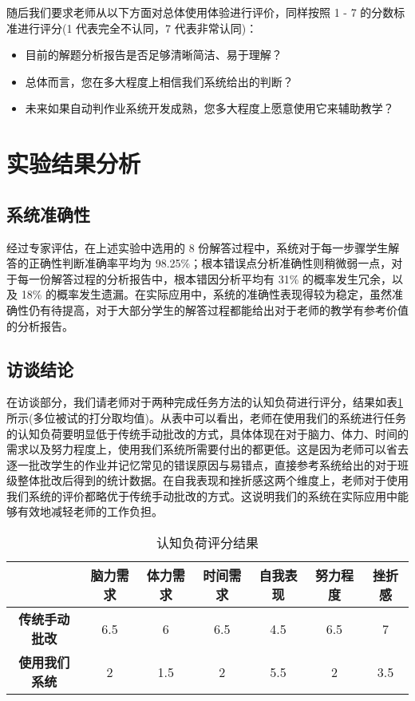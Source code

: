 随后我们要求老师从以下方面对总体使用体验进行评价，同样按照 1 - 7 的分数标准进行评分(1 代表完全不认同，7 代表非常认同)：

\begin{itemize}
    \item 目前的解题分析报告是否足够清晰简洁、易于理解？
    \item 总体而言，您在多大程度上相信我们系统给出的判断？
    \item 未来如果自动判作业系统开发成熟，您多大程度上愿意使用它来辅助教学？
\end{itemize}

\section{实验结果分析}

\subsection{系统准确性}

经过专家评估，在上述实验中选用的 8 份解答过程中，系统对于每一步骤学生解答的正确性判断准确率平均为 98.25\%；根本错误点分析准确性则稍微弱一点，对于每一份解答过程的分析报告中，根本错因分析平均有 31\% 的概率发生冗余，以及 18\% 的概率发生遗漏。在实际应用中，系统的准确性表现得较为稳定，虽然准确性仍有待提高，对于大部分学生的解答过程都能给出对于老师的教学有参考价值的分析报告。

\subsection{访谈结论}

在访谈部分，我们请老师对于两种完成任务方法的认知负荷进行评分，结果如表\ref{tab:nasa-tlx}所示(多位被试的打分取均值)。从表中可以看出，老师在使用我们的系统进行任务的认知负荷要明显低于传统手动批改的方式，具体体现在对于脑力、体力、时间的需求以及努力程度上，使用我们系统所需要付出的都更低。这是因为老师可以省去逐一批改学生的作业并记忆常见的错误原因与易错点，直接参考系统给出的对于班级整体批改后得到的统计数据。在自我表现和挫折感这两个维度上，老师对于使用我们系统的评价都略优于传统手动批改的方式。这说明我们的系统在实际应用中能够有效地减轻老师的工作负担。

\begin{table}
    \centering
    \caption{认知负荷评分结果}
    \label{tab:nasa-tlx}
    \begin{tabular}{c|cccccc}
        \toprule
        & \textbf{脑力需求} & \textbf{体力需求} & \textbf{时间需求} & \textbf{自我表现} & \textbf{努力程度} & \textbf{挫折感} \\
        \midrule
        \textbf{传统手动批改} & 6.5 & 6 & 6.5 & 4.5 & 6.5 & 7 \\
        \textbf{使用我们系统} & 2 & 1.5 & 2 & 5.5 & 2 & 3.5 \\
        \bottomrule
    \end{tabular}
\end{table}

